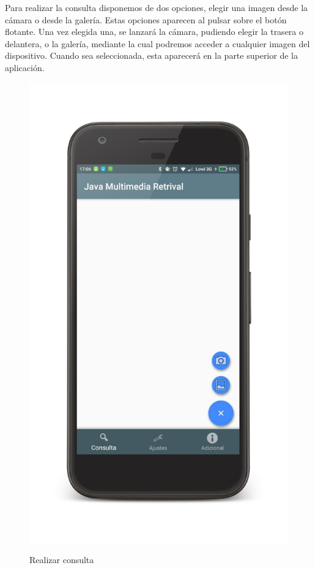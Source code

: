 Para realizar la consulta disponemos de dos opciones, elegir una imagen desde la cámara o desde la galería. Estas opciones aparecen al pulsar sobre el botón flotante. Una vez elegida una, se lanzará la cámara, pudiendo elegir la trasera o delantera, o la galería, mediante la cual podremos acceder a cualquier imagen del dispositivo. Cuando sea seleccionada, esta aparecerá en la parte superior de la aplicación.

\begin{figure}[H] %
\centering
\includegraphics[scale=0.15]{imagenes/hacerconsulta.png}  %
\label{hacerconsulta.png}
\caption{Realizar consulta}
\end{figure}

